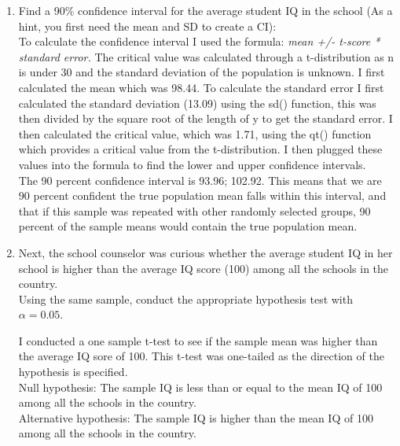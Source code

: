 \documentclass[12pt,letterpaper]{article}
\begin{document}
\begin{enumerate}
	\item Find a 90\% confidence interval for the average student IQ in the school (As a hint, you first need the mean and SD to create a CI):\\
	
 To calculate the confidence interval I used the formula: 
	\textit {mean +/- t-score * standard error.}
 The critical value was calculated through a t-distribution as n is under 30 and the standard deviation of the population is unknown. I first calculated the mean which was 98.44. To calculate the standard error I first calculated the standard deviation (13.09) using the sd() function, this was then divided by the square root of the length of y to get the standard error. I then calculated the critical value, which was 1.71, using the qt() function which provides a critical value from the t-distribution. I then plugged these values into the formula to find the lower and upper confidence intervals. \\
	
	  

	   
	
	  
	
	\noindent The 90 percent confidence interval is 93.96; 102.92. This means that we are 90 percent confident the true population mean falls within this interval, and that if this sample was repeated with other randomly selected groups, 90 percent of the sample means would contain the true population mean. \\
	
	\item Next, the school counselor was curious  whether  the average student IQ in her school is higher than the average IQ score (100) among all the schools in the country.\\ 
	\noindent Using the same sample, conduct the appropriate hypothesis test with $\alpha=0.05$.
	\vspace{.5cm}
	
	\noindent I conducted a one sample t-test to see if the sample mean was higher than the average IQ sore of 100. This t-test was one-tailed as the direction of the hypothesis is specified.  \\
	
	\noindent Null hypothesis: The sample IQ is less than or equal to the mean IQ of 100 among all the schools in the country. \\
	\noindent Alternative hypothesis: The sample IQ is higher than the mean IQ of 100 among all the schools in the country.  \\
	  
	

\end{enumerate}
\end{document}
